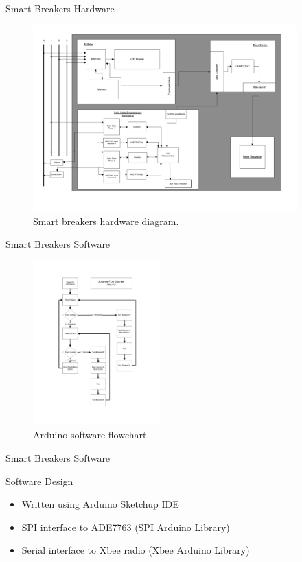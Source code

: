 \documentclass{beamer}
\begin{document}
\begin{frame}{Smart Breakers Hardware}
	\begin{figure}[htbp]
	\begin{center}
	\includegraphics[width=4in]{includes/smart_breaker_diagram}
	\caption{Smart breakers hardware diagram.}
	\label{fig:smart_break_diagram}
	\end{center}
	\end{figure}
\end{frame}

\begin{frame}{Smart Breakers Software}
	\begin{figure}[htbp]
	\begin{center}
	\includegraphics[height=2.5in]{includes/ArduinoSoftwareFlow}
	\caption{Arduino software flowchart.}
	\label{fig:arduino_software_flow}
	\end{center}
	\end{figure}
\end{frame}

\begin{frame}{Smart Breakers Software}
	\begin{block}{Software Design}
		\begin{itemize}
		\item <1-> Written using Arduino Sketchup IDE
		\item <2-> SPI interface to ADE7763 (SPI Arduino Library)
		\item <3-> Serial interface to Xbee radio (Xbee Arduino Library)
		\end{itemize}
	\end{block}
\end{frame}
\end{document}
